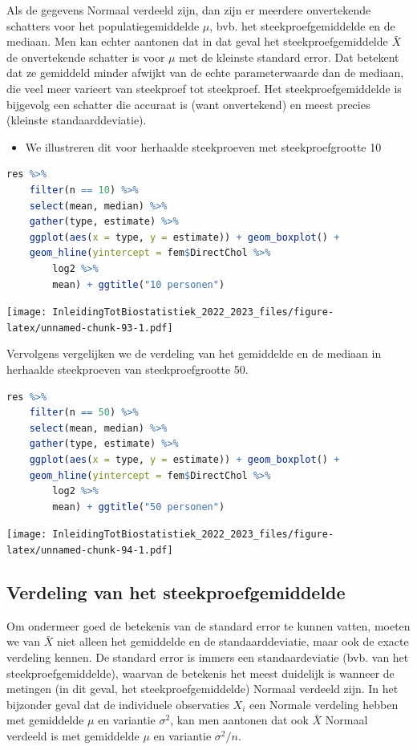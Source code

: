 \documentclass[
  12pt,dutch,coursenotes]{book}
\providecommand{\tightlist}{%
  \setlength{\itemsep}{0pt}\setlength{\parskip}{0pt}}
\begin{document}
Als de gegevens Normaal verdeeld zijn, dan zijn er meerdere onvertekende
schatters voor het populatiegemiddelde \(\mu\), bvb. het steekproefgemiddelde en
de mediaan. Men kan echter aantonen dat in dat geval het
steekproefgemiddelde \(\bar{X}\) de onvertekende schatter is voor \(\mu\) met de
kleinste standard error. Dat betekent dat ze gemiddeld minder afwijkt van
de echte parameterwaarde dan de mediaan, die veel meer
varieert van steekproef tot steekproef. Het steekproefgemiddelde is
bijgevolg een schatter die accuraat is (want onvertekend) en meest precies
(kleinste standaarddeviatie).

\begin{itemize}
\tightlist
\item
  We illustreren dit voor herhaalde steekproeven met steekproefgrootte 10
\end{itemize}

\begin{lstlisting}[language=R]
res %>%
    filter(n == 10) %>%
    select(mean, median) %>%
    gather(type, estimate) %>%
    ggplot(aes(x = type, y = estimate)) + geom_boxplot() +
    geom_hline(yintercept = fem$DirectChol %>%
        log2 %>%
        mean) + ggtitle("10 personen")
\end{lstlisting}

\texttt{[image: InleidingTotBiostatistiek\_2022\_2023\_files/figure-latex/unnamed-chunk-93-1.pdf]}

Vervolgens vergelijken we de verdeling van het gemiddelde en de mediaan in herhaalde steekproeven van steekproefgrootte 50.

\begin{lstlisting}[language=R]
res %>%
    filter(n == 50) %>%
    select(mean, median) %>%
    gather(type, estimate) %>%
    ggplot(aes(x = type, y = estimate)) + geom_boxplot() +
    geom_hline(yintercept = fem$DirectChol %>%
        log2 %>%
        mean) + ggtitle("50 personen")
\end{lstlisting}

\texttt{[image: InleidingTotBiostatistiek\_2022\_2023\_files/figure-latex/unnamed-chunk-94-1.pdf]}

\hypertarget{subsec:verdelingXbar}{%
\subsection{Verdeling van het steekproefgemiddelde}\label{subsec:verdelingXbar}}

Om ondermeer goed de betekenis van de standard error te kunnen vatten, moeten we van \(\bar X\) niet alleen het gemiddelde en de standaarddeviatie, maar ook de exacte verdeling kennen. De standard error is immers een standaardeviatie (bvb. van het steekproefgemiddelde), waarvan de betekenis het meest duidelijk is wanneer de metingen (in dit geval, het steekproefgemiddelde) Normaal verdeeld zijn.
In het bijzonder geval dat de
individuele observaties \(X_i\) een Normale verdeling hebben met gemiddelde \(\mu\) en variantie \(\sigma^2\), kan men aantonen dat ook \(\bar X\) Normaal verdeeld is met gemiddelde \(\mu\) en variantie \(\sigma^2/n.\)
\end{document}
